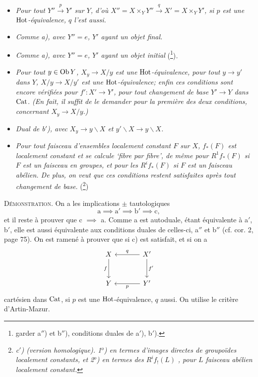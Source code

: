 \begin{itemize}[leftmargin=3em]
\item[\textit{a)}] \textit{Pour tout $Y'' \xrightarrow{p} Y'$ sur $Y$, d'où $X'' = X \times_Y Y'' \xrightarrow{q} X' = X \times_Y Y'$, si $p$ est une} $\mathrm{Hot}$\textit{-équivalence, $q$ l'est aussi.}

\item[\textit{a$'$)}] \textit{Comme a), avec $Y'' = e$, $Y'$ ayant un objet final.}

\item[\textit{a$''$)}] \textit{Comme a), avec $Y'' = e$, $Y'$ ayant un objet initial} (\footnote{garder a$''$) et b$''$), conditions duales de a$'$), b$'$).})\textit{.}

\item[\textit{b$'$)}] \textit{Pour tout $y \in \operatorname{Ob} Y$, $X_y \longrightarrow X/y$ est une} $\mathrm{Hot}$\textit{-équivalence, pour tout $y \longrightarrow y'$ dans $Y$, $X/y \longrightarrow X/y'$ est une} $\mathrm{Hot}$\textit{-équivalence; enfin ces conditions sont encore vérifiées pour $f' : X' \longrightarrow Y'$, pour tout changement de base $Y' \longrightarrow Y$ dans} $\mathrm{Cat}$\textit{. (En fait, il suffit de le demander pour la première des deux conditions, concernant $X_y \longrightarrow X/y$.)}

\item[\textit{b$''$)}] \textit{Dual de b$'$), avec $X_y \longrightarrow y\backslash X$ et $y'\backslash X \longrightarrow y\backslash X$.}

\item[\textit{c)}] \textit{Pour tout faisceau d'ensembles localement constant $F$ sur $X$, $f_*(F)$ est localement constant et se calcule `fibre par fibre', de même pour $R^1 f_*(F)$ si $F$ est un faisceau en groupes, et pour les $R^i f_*(F)$ si $F$ est un faisceau abélien. De plus, on veut que ces conditions restent satisfaites après tout changement de base.} (\footnote{\textit{c$'$) (version homologique). 1$^o$) en termes d'images directes de groupoïdes localement constants, et 2$^o$) en termes des $R^i f_!(L)$} \textit{, pour $L$ faisceau abélien localement constant.}})
\end{itemize}

\noindent\textsc{Démonstration}. On a les implications $\pm$ tautologiques
\[
\mathrm{a} \implies \mathrm{a}' \implies \mathrm{b}' \implies \mathrm{c},
\]
et il reste à prouver que c $\implies$ a. Comme a est autoduale, étant équivalente à a$'$, b$'$, elle est aussi équivalente aux conditions duales de celles-ci, a$''$ et b$''$ (cf. cor. 2, page 75). On est ramené à prouver que si c) est satisfait, et si on a
\[
\begin{tikzcd}[row sep=large, column sep=large]
X \arrow[d, "f"'] & X' \arrow[l, "q"'] \arrow[d, "f'"] \\
Y & Y' \arrow[l, "p"]
\end{tikzcd}
\]
cartésien dans $\mathrm{Cat}$, si $p$ est une $\mathrm{Hot}$-équivalence, $q$ aussi. On utilise le critère d'Artin-Mazur.

